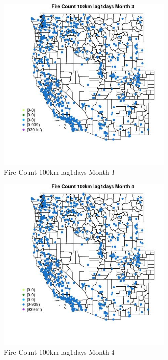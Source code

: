 \begin{figure} 
\centering  
\includegraphics[width=0.77\textwidth]{Code_Outputs/Report_ML_input_PM25_Step4_part_e_de_duplicated_aves_compiled_2019-05-21wNAs_MapObsMo3Fire_Count_100km_lag1days.jpg} 
\caption{\label{fig:Report_ML_input_PM25_Step4_part_e_de_duplicated_aves_compiled_2019-05-21wNAsMapObsMo3Fire_Count_100km_lag1days}Fire Count 100km lag1days Month 3} 
\end{figure} 
 

\begin{figure} 
\centering  
\includegraphics[width=0.77\textwidth]{Code_Outputs/Report_ML_input_PM25_Step4_part_e_de_duplicated_aves_compiled_2019-05-21wNAs_MapObsMo4Fire_Count_100km_lag1days.jpg} 
\caption{\label{fig:Report_ML_input_PM25_Step4_part_e_de_duplicated_aves_compiled_2019-05-21wNAsMapObsMo4Fire_Count_100km_lag1days}Fire Count 100km lag1days Month 4} 
\end{figure} 
 

